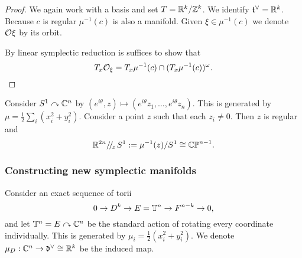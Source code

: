 \begin{proof}
    We again work with a basis and set $T=\mathbb{R}^k/\mathbb{Z}^k$.
    We identify $\mathfrak{t}^\vee=\mathbb{R}^k$.
    Because $c$ is regular $\mu^{-1}(c)$ is also a manifold.
    Given $\xi\in\mu^{-1}(c)$ we denote $\mathcal{O}\xi$ by its orbit.

    By linear symplectic reduction is suffices to show that
    \[T_x\mathcal{O}_\xi=T_x\mu^{-1}(c)\cap(T_x\mu^{-1}(c))^\omega.\]
\end{proof}

\begin{example}
    Consider $S^1\curvearrowright\mathbb{C}^n$ by $(e^{i\theta},z)\mapsto(e^{i\theta}z_1,\ldots,e^{i\theta}z_n)$.
    This is generated by $\mu=\frac12\sum_i(x_i^2+y_i^2)$.
    Consider a point $z$ such that each $z_i\neq0$.
    Then $z$ is regular and
    \[\mathbb{R}^{2n}/\!/_{\!z\,}S^1:=\mu^{-1}(z)/S^1\cong\mathbb{CP}^{n-1}.\]
\end{example}

\subsubsection*{Constructing new symplectic manifolds}
Consider an exact sequence of torii
\[0\to D^k\to E=\mathbb{T}^n\to F^{n-k}\to 0,\]
and let $\mathbb{T}^n=E\curvearrowright\mathbb{C}^n$ be the standard action of rotating every coordinate individually.
This is generated by $\mu_i=\frac12(x_i^2+y_i^2)$.
We denote $\mu_D:\mathbb{C}^n\to\mathfrak{d}^\vee\cong\mathbb{R}^k$ be the induced map.